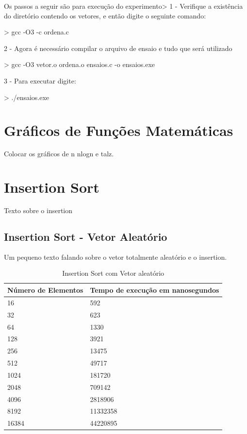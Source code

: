 \documentclass[12pt,a4paper,twoside]{report}
\begin{document}
Os passos a seguir são para execução do experimento>
1 - Verifique a existência do diretório contendo os vetores, e então digite o seguinte comando:
\begin{terminal}
    > gcc -O3 -c ordena.c
\end{terminal}
2 - Agora é necessário compilar o arquivo de ensaio e tudo que será utilizado
\begin{terminal}
    > gcc -O3 vetor.o ordena.o ensaios.c -o ensaios.exe
\end{terminal}
3 - Para executar digite:
\begin{terminal}
    > ./ensaios.exe
\end{terminal}

\chapter{Gráficos de Funções Matemáticas}
Colocar os gráficos de n nlogn e talz.

\chapter{Insertion Sort}
Texto sobre o insertion

\section{Insertion Sort - Vetor Aleatório}
Um pequeno texto falando sobre o vetor totalmente aleatório e o insertion.
\begin{table}[H]
\centering
\caption{Insertion Sort com Vetor aleatório}
\begin{tabular}{|l|l|}
\hline
\multicolumn{1}{|c|}{\textbf{Número de Elementos}} & \multicolumn{1}{c|}{\textbf{Tempo de execução em nanosegundos}} \\ \hline
16 & 592 \\ \hline
32 & 623 \\ \hline
64 & 1330 \\ \hline
128 & 3921 \\ \hline
256 & 13475 \\ \hline
512 & 49717 \\ \hline
1024 & 181720 \\ \hline
2048 & 709142 \\ \hline
4096 & 2818906 \\ \hline
8192 & 11332358 \\ \hline
16384 & 44220895 \\ \hline
\end{tabular}
\end{table}
\end{document}
